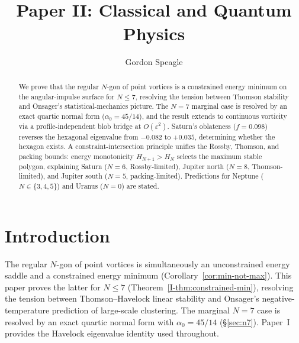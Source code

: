 










\title{\seriestitle\\[6pt]\large Paper II: Classical and Quantum Physics}
\author{Gordon Speagle}
\date{}


\maketitle

\begin{abstract}
We prove that the regular $N$-gon of point vortices is a
constrained energy minimum on the angular-impulse surface
for $N \le 7$, resolving the tension between Thomson stability
and Onsager's statistical-mechanics picture.
The $N = 7$ marginal case is resolved by an exact quartic
normal form ($\alpha_0 = 45/14$), and the result extends to
continuous vorticity via a profile-independent blob bridge
at $O(\varepsilon^2)$.
Saturn's oblateness ($f = 0.098$) reverses the hexagonal
eigenvalue from $-0.082$ to $+0.035$, determining whether
the hexagon exists.
A constraint-intersection principle unifies the Rossby,
Thomson, and packing bounds: energy monotonicity
$H_{N+1} > H_N$ selects the maximum stable polygon,
explaining Saturn ($N = 6$, Rossby-limited),
Jupiter north ($N = 8$, Thomson-limited), and
Jupiter south ($N = 5$, packing-limited).
Predictions for Neptune ($N \in \{3, 4, 5\}$) and
Uranus ($N = 0$) are stated.
\end{abstract}

\section{Introduction}
\label{sec:intro}

The regular $N$-gon of point vortices is simultaneously
an unconstrained energy saddle and a constrained energy
minimum (Corollary~\ref{cor:min-not-max}).
This paper proves the latter for $N \le 7$
(Theorem~\ref*{I-thm:constrained-min}), resolving the
tension between Thomson--Havelock linear stability
and Onsager's negative-temperature prediction of
large-scale clustering.
The marginal $N = 7$ case is resolved by an exact
quartic normal form with $\alpha_0 = 45/14$
(\S\ref{sec:n7}).
Paper~I provides the Havelock eigenvalue identity
used throughout.

